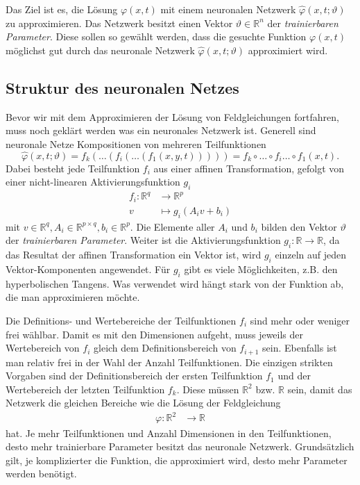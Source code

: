Das Ziel ist es, die Lösung $\varphi(x, t)$ mit einem neuronalen Netzwerk $\hat{\varphi}(x, t; \vartheta)$ zu approximieren.
Das Netzwerk besitzt einen Vektor \( \vartheta \in \mathbb{R}^n \) der \emph{trainierbaren Parameter}.
Diese sollen so gewählt werden, dass die gesuchte Funktion $\varphi(x, t)$ möglichst gut durch das neuronale Netzwerk $\hat{\varphi}(x, t; \vartheta)$ approximiert wird.


\subsection{Struktur des neuronalen Netzes}\label{neuronal:subsection:struktur_nn}
Bevor wir mit dem Approximieren der Lösung von Feldgleichungen fortfahren, muss noch geklärt werden was ein neuronales Netzwerk ist.
Generell sind neuronale Netze Kompositionen von mehreren Teilfunktionen
\begin{equation}
    \hat{\varphi}(x, t; \vartheta) = f_k(\ldots(f_i(\ldots(f_1(x, y, t))))) = f_k \circ \ldots \circ f_i \ldots \circ f_1(x, t).
    \label{neuronal:nn_ausformuliert}
\end{equation}
Dabei besteht jede Teilfunktion \( f_i \) aus einer affinen Transformation, gefolgt von einer nicht-linearen Aktivierungsfunktion \( g_i \)
\begin{align*}
    f_i\colon \mathbb{R}^q & \longrightarrow\mathbb{R}^p \\[-1ex]
    v & \longmapsto g_i(A_iv + b_i)
\end{align*}
mit \( v \in \mathbb{R}^q, A_i \in \mathbb{R}^{p \times q}, b_i \in \mathbb{R}^p \). 
Die Elemente aller \( A_i \) und \( b_i \) bilden den Vektor \( \vartheta \) der \emph{trainierbaren Parameter}.
Weiter ist die Aktivierungsfunktion \( g_i\colon \mathbb{R} \longrightarrow\mathbb{R} \), da das Resultat der affinen Transformation ein Vektor ist, wird \( g_i \) einzeln auf jeden Vektor-Komponenten angewendet.
Für \( g_i \) gibt es viele Möglichkeiten, z.B. den hyperbolischen Tangens.
Was verwendet wird hängt stark von der Funktion ab, die man approximieren möchte.

Die Definitions- und Wertebereiche der Teilfunktionen \( f_i \) sind mehr oder weniger frei wählbar.
Damit es mit den Dimensionen aufgeht, muss jeweils der Wertebereich von \( f_i \) gleich dem Definitionsbereich von \( f_{i+1} \) sein.
Ebenfalls ist man relativ frei in der Wahl der Anzahl Teilfunktionen.
Die einzigen strikten Vorgaben sind der Definitionsbereich der ersten Teilfunktion \( f_1 \) und der Wertebereich der letzten Teilfunktion \( f_k \).
Diese müssen \( \mathbb{R}^2 \) bzw. \( \mathbb{R} \) sein, damit das Netzwerk die gleichen Bereiche wie die Lösung der Feldgleichung
\begin{align*}
    \varphi\colon \mathbb{R}^2 & \longrightarrow\mathbb{R}
\end{align*}
hat.
Je mehr Teilfunktionen und Anzahl Dimensionen in den Teilfunktionen, desto mehr trainierbare Parameter besitzt das neuronale Netzwerk.
Grundsätzlich gilt, je komplizierter die Funktion, die approximiert wird, desto mehr Parameter werden benötigt.

